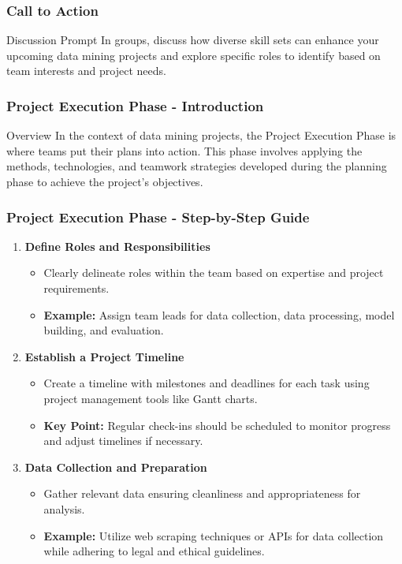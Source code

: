 \documentclass[aspectratio=169]{beamer}
\begin{document}
\begin{frame}[fragile]
    \frametitle{Call to Action}
    \begin{block}{Discussion Prompt}
        In groups, discuss how diverse skill sets can enhance your upcoming data mining projects and explore specific roles to identify based on team interests and project needs.
    \end{block}
\end{frame}

\begin{frame}[fragile]
    \frametitle{Project Execution Phase - Introduction}
    \begin{block}{Overview}
        In the context of data mining projects, the Project Execution Phase is where teams put their plans into action. This phase involves applying the methods, technologies, and teamwork strategies developed during the planning phase to achieve the project's objectives.
    \end{block}
\end{frame}

\begin{frame}[fragile]
    \frametitle{Project Execution Phase - Step-by-Step Guide}
    \begin{enumerate}
        \item \textbf{Define Roles and Responsibilities}
            \begin{itemize}
                \item Clearly delineate roles within the team based on expertise and project requirements.
                \item \textbf{Example:} Assign team leads for data collection, data processing, model building, and evaluation.
            \end{itemize}
        \item \textbf{Establish a Project Timeline}
            \begin{itemize}
                \item Create a timeline with milestones and deadlines for each task using project management tools like Gantt charts.
                \item \textbf{Key Point:} Regular check-ins should be scheduled to monitor progress and adjust timelines if necessary.
            \end{itemize}
        \item \textbf{Data Collection and Preparation}
            \begin{itemize}
                \item Gather relevant data ensuring cleanliness and appropriateness for analysis.
                \item \textbf{Example:} Utilize web scraping techniques or APIs for data collection while adhering to legal and ethical guidelines.
            \end{itemize}
    \end{enumerate}
\end{frame}
\end{document}
